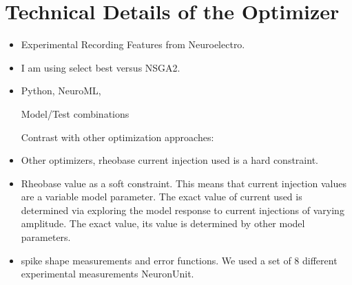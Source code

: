 \section{Technical Details of the Optimizer}
\begin{itemize}

\item Experimental Recording Features from Neuroelectro.

\item I am using select best versus NSGA2.
\item Python, NeuroML, 

Model/Test combinations

Contrast with other optimization approaches:

\item Other optimizers, rheobase current injection used is a hard constraint.
\item Rheobase value as a soft constraint. This means that current injection values are a variable model parameter. The exact value of current used is determined via exploring the model response to current injections of varying amplitude. The exact value, its value is determined by other model parameters.

\item spike shape measurements and error functions. We used a set of 8 different experimental measurements NeuronUnit.
\end{itemize}
